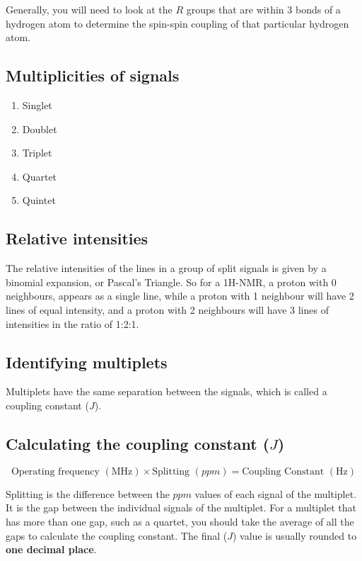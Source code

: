 \documentclass[11pt]{article}
\begin{document}
Generally, you will need to look at the \(R\) groups that are within 3 bonds of a hydrogen atom to determine the spin-spin coupling of that particular hydrogen atom.

\subsection{Multiplicities of signals}
\label{sec:orgb90d5e2}
\begin{enumerate}
\item Singlet
\item Doublet
\item Triplet
\item Quartet
\item Quintet
\end{enumerate}

\subsection{Relative intensities}
\label{sec:orgea8f7a3}
The relative intensities of the lines in a group of split signals is given by a binomial expansion, or Pascal's Triangle. So for a 1H-NMR, a proton with 0 neighbours, appears as a single line, while a proton with 1 neighbour will have 2 lines of equal intensity, and a proton with 2 neighbours will have 3 lines of intensities in the ratio of 1:2:1.

\subsection{Identifying multiplets}
\label{sec:org47d7206}
Multiplets have the same separation between the signals, which is called a coupling constant (\(J\)).

\subsection{Calculating the coupling constant (\(J\))}
\label{sec:orgc387135}
\[\text{Operating frequency } (\si{\mega\hertz}) \times \text{Splitting } (\si{ppm}) = \text{Coupling Constant } (\si{\hertz})\]

Splitting is the difference between the \(\si{ppm}\) values of each signal of the multiplet. It is the gap between the individual signals of the multiplet. For a multiplet that has more than one gap, such as a quartet, you should take the average of all the gaps to calculate the coupling constant. The final (\(J\)) value is usually rounded to \textbf{one decimal place}.
\end{document}
